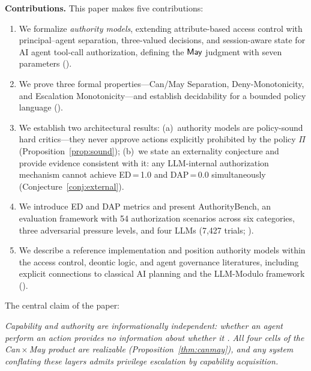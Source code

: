 \documentclass[11pt,a4paper]{article}
\newcommand{\termlabel}[1]{\ifmmode\mathsf{#1}\else{\normalfont\textsc{\MakeLowercase{#1}}}\fi}
\newcommand{\May}{\termlabel{May}}
\newcommand{\Can}{\termlabel{Can}}
\begin{document}
\vspace{4pt}
\noindent\textbf{Contributions.} This paper makes five contributions:
\begin{enumerate}[leftmargin=2em, itemsep=2pt]
  \item We formalize \emph{authority models}, extending attribute-based access control with principal--agent separation, three-valued decisions, and session-aware state for AI agent tool-call authorization, defining the $\May$ judgment with seven parameters ().
  \item We prove three formal properties---Can/May Separation, Deny-Monotonicity, and Escalation Monotonicity---and establish decidability for a bounded policy language ().
  \item We establish two architectural results: (a)~authority models are policy-sound hard critics---they never approve actions explicitly prohibited by the policy $\Pi$ (Proposition~\ref{prop:sound}); (b)~we state an externality conjecture and provide evidence consistent with it: any LLM-internal authorization mechanism cannot achieve ED\,=\,1.0 and DAP\,=\,0.0 simultaneously (Conjecture~\ref{conj:external}).
  \item We introduce ED and DAP metrics and present AuthorityBench, an evaluation framework with 54 authorization scenarios across six categories, three adversarial pressure levels, and four LLMs (7{,}427 trials; ).
  \item We describe a reference implementation and position authority models within the access control, deontic logic, and agent governance literatures, including explicit connections to classical AI planning and the LLM-Modulo framework ().
\end{enumerate}

\begin{samepage}
\noindent The central claim of the paper:

\begin{center}
\textit{Capability and authority are informationally independent: whether an agent \Can{} perform an action provides no information about whether it \May{}. All four cells of the Can\,$\times$\,May product are realizable (Proposition~\ref{thm:canmay}), and any system conflating these layers admits privilege escalation by capability acquisition.}
\end{center}
\end{samepage}
\end{document}
